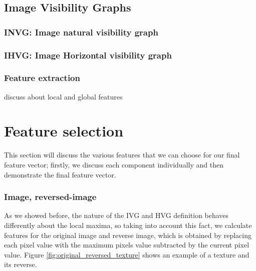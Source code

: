 \documentclass[conference]{IEEEtran}
\begin{document}
\subsection{\textbf{Image Visibility Graphs}}
\subsubsection{INVG: Image natural visibility graph}
\subsubsection{IHVG: Image Horizontal visibility graph}
\subsubsection{Feature extraction }
discuss about local and global features



\section{Feature selection}
This section will discuss the various features that we can choose for our final feature vector; firstly, we discuss each component individually and then demonstrate the final feature vector.


\subsubsection{\textbf{Image, reversed-image}}
As we showed before, the nature of the IVG and HVG definition behaves differently about the local maxima, so taking into account this fact, we calculate features for the original image and reverse image, which is obtained by replacing each pixel value with the maximum pixels value subtracted by the current pixel value.
Figure \ref{fig:original_reversed_texture} shows an example of a texture and its reverse.
\end{document}
